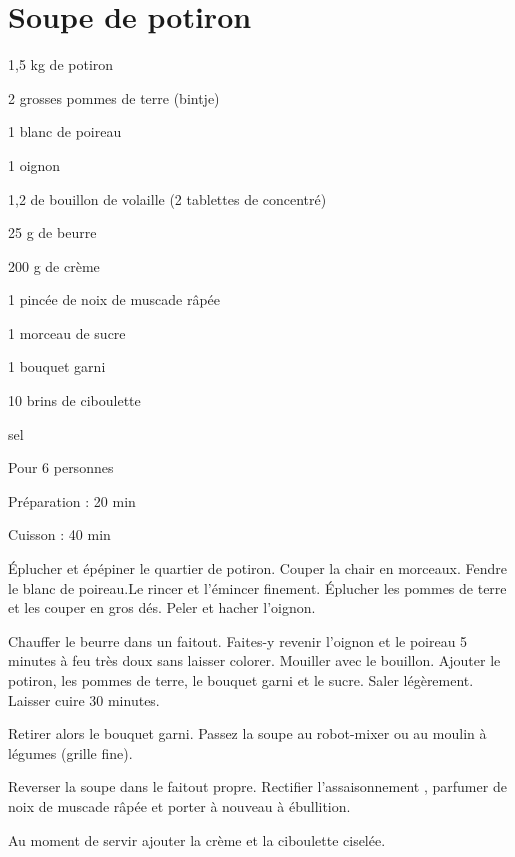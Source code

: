 \section{Soupe de potiron}

\begin{ingredients}
\item 1,5 kg de potiron
\item 2 grosses pommes de terre (bintje)
\item 1 blanc de poireau
\item 1 oignon
\item 1,2 de bouillon de volaille (2 tablettes de concentré)
\item 25 g de beurre
\item 200 g de crème
\item 1 pincée de noix de muscade râpée
\item 1 morceau de sucre
\item 1 bouquet garni
\item 10 brins de ciboulette
\item sel
\end{ingredients}
\begin{infos}
\item Pour 6 personnes		%
\item Préparation : 20 min		%
\item Cuisson : 40 min			%
\end{infos}
\begin{etapes}
\item Éplucher et épépiner le quartier de potiron. Couper la chair en morceaux. Fendre le blanc de poireau.Le rincer et l'émincer finement. Éplucher les pommes de terre et les couper en gros dés. Peler et hacher l’oignon.  
\item Chauffer le beurre dans un faitout. Faites-y revenir l’oignon et le poireau 5 minutes à feu très doux sans laisser colorer. Mouiller avec le bouillon. Ajouter le potiron, les pommes de terre, le bouquet garni et le sucre. Saler légèrement. Laisser cuire 30 minutes.
\item Retirer  alors le bouquet garni. Passez la soupe au robot-mixer ou au moulin à légumes (grille fine).
\item Reverser la soupe dans le faitout propre. Rectifier l’assaisonnement , parfumer de noix de muscade râpée et porter à nouveau à ébullition.
\item Au moment de servir ajouter la crème et la ciboulette ciselée.
\end{etapes}
\begin{conseils}
\end{conseils}

